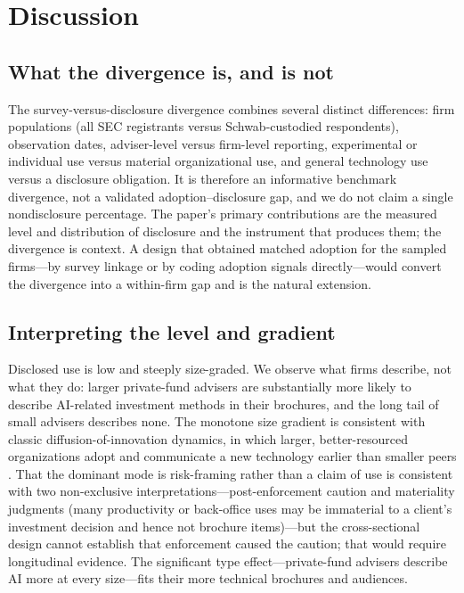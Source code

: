 \documentclass[utf8]{FrontiersinHarvard} %
\begin{document}
\section{Discussion}

\subsection{What the divergence is, and is not}
The survey-versus-disclosure divergence combines several distinct differences: firm populations (all SEC registrants versus Schwab-custodied respondents), observation dates, adviser-level versus firm-level reporting, experimental or individual use versus material organizational use, and general technology use versus a disclosure obligation. It is therefore an informative benchmark divergence, not a validated adoption--disclosure gap, and we do not claim a single nondisclosure percentage. The paper's primary contributions are the measured level and distribution of disclosure and the instrument that produces them; the divergence is context. A design that obtained matched adoption for the sampled firms---by survey linkage or by coding adoption signals directly---would convert the divergence into a within-firm gap and is the natural extension.

\subsection{Interpreting the level and gradient}
Disclosed use is low and steeply size-graded. We observe what firms describe, not what they do: larger private-fund advisers are substantially more likely to describe AI-related investment methods in their brochures, and the long tail of small advisers describes none. The monotone size gradient is consistent with classic diffusion-of-innovation dynamics, in which larger, better-resourced organizations adopt and communicate a new technology earlier than smaller peers \citep{rogers2003}. That the dominant mode is risk-framing rather than a claim of use is consistent with two non-exclusive interpretations---post-enforcement caution and materiality judgments (many productivity or back-office uses may be immaterial to a client's investment decision and hence not brochure items)---but the cross-sectional design cannot establish that enforcement caused the caution; that would require longitudinal evidence. The significant type effect---private-fund advisers describe AI more at every size---fits their more technical brochures and audiences.
\end{document}
